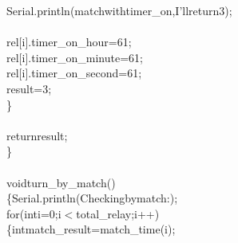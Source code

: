 \documentclass[a4paper, 12pt]{article}
\newcommand\SPC{\hspace*{0.6em}}
\newcommand\QOT{\mbox{\char 34}}
\newcommand{\CppAIdentifier}[1]{\textcolor[rgb]{0,1,0}{#1}}
\newcommand{\CppANumber}[1]{\textcolor[rgb]{0,0,1}{#1}}
\newcommand{\CppAReservedWord}[1]{\textcolor[rgb]{0,0.5,0}{#1}}
\newcommand{\CppASpace}[1]{\textcolor[rgb]{1,1,1}{\colorbox[rgb]{0,0,0}{#1}}}
\newcommand{\CppAString}[1]{\textcolor[rgb]{0.76,0.76,0.76}{#1}}
\newcommand{\CppASymbol}[1]{\textcolor[rgb]{1,0,0}{#1}}
\begin{document}
\begin{ttfamily}
\CppASpace{\SPC \SPC \SPC \SPC \SPC \SPC \SPC \SPC }\CppAIdentifier{Serial}\CppASymbol{.}\CppAIdentifier{println}\CppASymbol{(}\CppAString{\QOT \SPC match\SPC with\SPC timer\_on,\SPC I'll\SPC return\SPC 3\QOT }\CppASymbol{)}\CppASymbol{;}\\
\CppASpace{\SPC \SPC \SPC \SPC \SPC \SPC \SPC \SPC \SPC \SPC \SPC }\\
\CppASpace{\SPC \SPC \SPC \SPC \SPC \SPC \SPC \SPC }\CppAIdentifier{rel}\CppASymbol{[}\CppAIdentifier{i}\CppASymbol{]}\CppASymbol{.}\CppAIdentifier{timer\_on\_hour}\CppASpace{\SPC }\CppASymbol{=}\CppASpace{\SPC }\CppANumber{61}\CppASymbol{;}\\
\CppASpace{\SPC \SPC \SPC \SPC \SPC \SPC \SPC \SPC }\CppAIdentifier{rel}\CppASymbol{[}\CppAIdentifier{i}\CppASymbol{]}\CppASymbol{.}\CppAIdentifier{timer\_on\_minute}\CppASpace{\SPC }\CppASymbol{=}\CppASpace{\SPC }\CppANumber{61}\CppASymbol{;}\\
\CppASpace{\SPC \SPC \SPC \SPC \SPC \SPC \SPC \SPC }\CppAIdentifier{rel}\CppASymbol{[}\CppAIdentifier{i}\CppASymbol{]}\CppASymbol{.}\CppAIdentifier{timer\_on\_second}\CppASpace{\SPC }\CppASymbol{=}\CppASpace{\SPC }\CppANumber{61}\CppASymbol{;}\\
\CppASpace{\SPC \SPC \SPC \SPC \SPC \SPC \SPC \SPC }\CppAIdentifier{result}\CppASymbol{=}\CppANumber{3}\CppASymbol{;}\\
\CppASpace{\SPC \SPC \SPC \SPC \SPC \SPC \SPC }\CppASymbol{\}}\\
\\
\CppASpace{\SPC \SPC \SPC }\CppAReservedWord{return}\CppASpace{\SPC }\CppAIdentifier{result}\CppASymbol{;}\\
\CppASymbol{\}}\\
\\
\CppAReservedWord{void}\CppASpace{\SPC }\CppAIdentifier{turn\_by\_match}\CppASymbol{(}\CppASymbol{)}\\
\CppASymbol{\{}\CppASpace{\SPC }\CppAIdentifier{Serial}\CppASymbol{.}\CppAIdentifier{println}\CppASymbol{(}\CppAString{\QOT Checking\SPC by\SPC match\SPC :\SPC \QOT }\CppASymbol{)}\CppASymbol{;}\\
\CppASpace{\SPC \SPC }\CppAReservedWord{for}\CppASpace{\SPC }\CppASymbol{(}\CppAReservedWord{int}\CppASpace{\SPC }\CppAIdentifier{i}\CppASymbol{=}\CppANumber{0}\CppASymbol{;}\CppASpace{\SPC }\CppAIdentifier{i}\CppASymbol{$<$}\CppAIdentifier{total\_relay}\CppASymbol{;}\CppASpace{\SPC }\CppAIdentifier{i}\CppASymbol{++}\CppASymbol{)}\\
\CppASpace{\SPC \SPC \SPC }\CppASymbol{\{}\CppAReservedWord{int}\CppASpace{\SPC }\CppAIdentifier{match\_result}\CppASpace{\SPC }\CppASymbol{=}\CppASpace{\SPC }\CppAIdentifier{match\_time}\CppASymbol{(}\CppAIdentifier{i}\CppASymbol{)}\CppASymbol{;}\\

\end{ttfamily}
\end{document}
